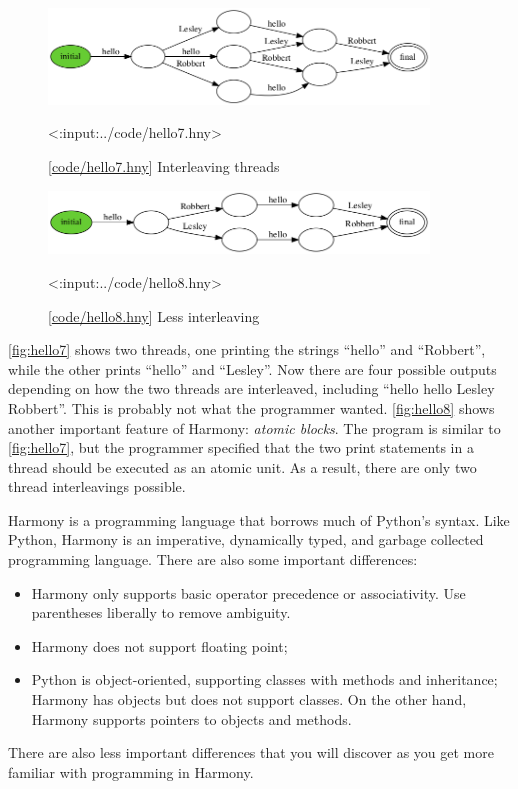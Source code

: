 \documentclass{report}
\newcommand{\harmonylink}[1]{%
[\href{https://harmony.cs.cornell.edu/#1}{\underline{#1}}]%
}
\newenvironment{code}{
\tcolorbox
}{
\endtcolorbox
}
\begin{document}
\begin{figure}
\begin{center}
\includegraphics[width=0.9\textwidth]{figures/hello7.png}
\end{center}
\begin{code}
<{:input:../code/hello7.hny}>
\end{code}
\caption{\harmonylink{code/hello7.hny} Interleaving threads}
\label{fig:hello7}
\end{figure}

\begin{figure}
\begin{center}
\includegraphics[width=0.9\textwidth]{figures/hello8.png}
\end{center}
\begin{code}
<{:input:../code/hello8.hny}>
\end{code}
\caption{\harmonylink{code/hello8.hny} Less interleaving}
\label{fig:hello8}
\end{figure}

\autoref{fig:hello7} shows two threads, one printing the strings
``hello'' and ``Robbert'', while the other prints ``hello'' and
``Lesley''.  Now there are four possible outputs depending on
how the two threads are interleaved, including
``hello hello Lesley Robbert''.  This is probably not what
the programmer wanted.  \autoref{fig:hello8} shows another
important feature of Harmony: \emph{atomic blocks}.  The
program is similar to \autoref{fig:hello7}, but the programmer
specified that the two print statements in a thread should
be executed as an atomic unit.  As a result, there are only
two thread interleavings possible.

Harmony is a programming language that borrows much of
Python's syntax.
Like Python, Harmony is an imperative,
dynamically typed, and garbage collected programming language.
There are also some important differences:
\begin{itemize}
\item Harmony only supports basic operator precedence or associativity.
Use parentheses liberally to remove ambiguity.
\item Harmony does not support floating point;
\item Python is object-oriented, supporting classes with methods and
inheritance; Harmony has objects but does not support classes.
On the other hand, Harmony supports pointers to objects and methods.
\end{itemize}
There are also less important differences that you will discover as
you get more familiar with programming in Harmony.
\end{document}
